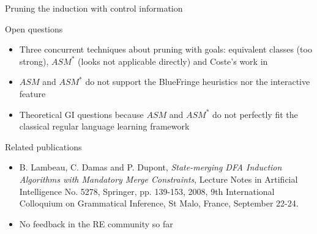 \begin{frame}{Pruning the induction with control information}
	\begin{block}{Open questions}
		\begin{itemize}
			\item Three concurrent techniques about pruning with goals: equivalent classes (too strong), $ASM^*$ (looks not 
				applicable directly) and Coste's work in \cite{Coste04}
			\item $ASM$ and $ASM^*$ do not support the BlueFringe heuristics nor the interactive feature
			\item Theoretical GI questions because $ASM$ and $ASM^*$ do not perfectly fit the classical regular language learning framework
		\end{itemize}
	\end{block}
	\begin{block}{Related publications}
   		\scriptsize
		\begin{itemize}
			\item B. Lambeau, C. Damas and P. Dupont, \emph{State-merging DFA Induction Algorithms with Mandatory Merge Constraints}, 
	                             Lecture Notes in Artificial Intelligence No. 5278, Springer, pp. 139-153, 2008, 9th International Colloquium on Grammatical Inference, 
	                             St Malo, France, September 22-24.
			\item No feedback in the RE community so far
		\end{itemize}
	   \end{block}
\end{frame}
